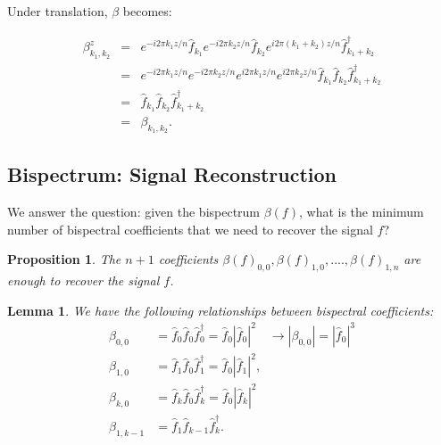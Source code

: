 \documentclass{article}
\newtheorem{proposition}{Proposition}
\newtheorem{lemma}{Lemma}
\begin{document}
Under translation, $\beta$ becomes:

\vspace{-1cm}
\begin{eqnarray*}
\beta^z_{k_1, k_2} &=& e^{-i 2 \pi k_1 z / n} \hat{f}_{k_1}  e^{-i 2 \pi k_2 z/ n} \hat{f}_{k_2} e^{i 2 \pi (k_1+k_2) z / n} \hat{f}^{\dagger}_{k_1 + k_2} \\
 &=& e^{-i 2 \pi k_1 z / n} e^{-i 2 \pi k_2 z/ n} e^{i 2 \pi k_1 z / n} e^{i 2 \pi k_2 z / n}\hat{f}_{k_1} \hat{f}_{k_2} \hat{f}^{\dagger}_{k_1 + k_2} \\
 &=& \hat{f}_{k_1} \hat{f}_{k_2} \hat{f}^{\dagger}_{k_1 + k_2}
\\ &=& \beta_{k_1, k_2}.
\end{eqnarray*}


\subsection{Bispectrum: Signal Reconstruction}

We answer the question: given the bispectrum $\beta(f)$, what is the minimum number of bispectral coefficients that we need to recover the signal $f$?

\begin{proposition}
    The $n+1$ coefficients $\beta(f)_{0, 0}, \beta(f)_{1, 0}, ...., \beta(f)_{1, n}$ are enough to recover the signal $f$.
\end{proposition}

\begin{lemma}
    We have the following relationships between bispectral coefficients:
    \begin{align*}
    \beta_{0, 0}
    &= \hat{f}_{0}\hat{f}_{0}\hat{f}^{\dagger}_{0}
    = \hat{f}_{0} | \hat{f}_{0} |^2 \quad \rightarrow |\beta_{0, 0}| = |\hat{f}_{0}|^3\\
    \beta_{1, 0}
        &= \hat{f}_{1} \hat{f}_{0} \hat{f}^{\dagger}_{1}
        =  \hat{f}_{0} | \hat{f}_{1} |^2, \\
    \beta_{k, 0}
        &= \hat{f}_{k} \hat{f}_{0} \hat{f}^{\dagger}_{k} =  \hat{f}_{0} |\hat{f}_{k}|^2 \\
    \beta_{1, k-1}
        &= \hat{f}_{1} \hat{f}_{k-1} \hat{f}^{\dagger}_{k} .
    \end{align*}
\end{lemma}
\end{document}
